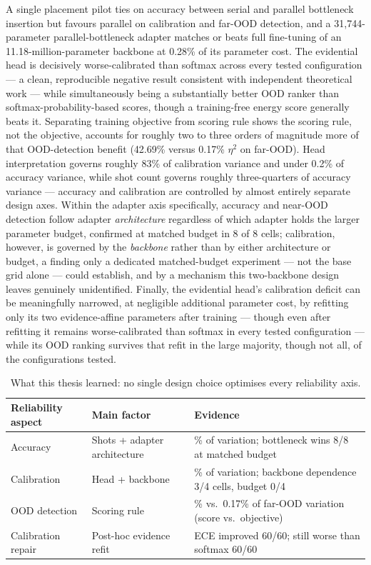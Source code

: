\documentclass{iutbscthesis}
\begin{document}
A single placement pilot ties on accuracy between serial and parallel bottleneck insertion but favours parallel on calibration and far-OOD detection, and a 31{,}744-parameter parallel-bottleneck adapter matches or beats full fine-tuning of an 11.18-million-parameter backbone at 0.28\% of its parameter cost. The evidential head is decisively worse-calibrated than softmax across every tested configuration — a clean, reproducible negative result consistent with independent theoretical work — while simultaneously being a substantially better OOD ranker than softmax-probability-based scores, though a training-free energy score generally beats it. Separating training objective from scoring rule shows the scoring rule, not the objective, accounts for roughly two to three orders of magnitude more of that OOD-detection benefit (42.69\% versus 0.17\% $\eta^2$ on far-OOD). Head interpretation governs roughly 83\% of calibration variance and under 0.2\% of accuracy variance, while shot count governs roughly three-quarters of accuracy variance — accuracy and calibration are controlled by almost entirely separate design axes. Within the adapter axis specifically, accuracy and near-OOD detection follow adapter \emph{architecture} regardless of which adapter holds the larger parameter budget, confirmed at matched budget in 8 of 8 cells; calibration, however, is governed by the \emph{backbone} rather than by either architecture or budget, a finding only a dedicated matched-budget experiment — not the base grid alone — could establish, and by a mechanism this two-backbone design leaves genuinely unidentified. Finally, the evidential head's calibration deficit can be meaningfully narrowed, at negligible additional parameter cost, by refitting only its two evidence-affine parameters after training — though even after refitting it remains worse-calibrated than softmax in every tested configuration — while its OOD ranking survives that refit in the large majority, though not all, of the configurations tested.

\begin{table}[H]
    \centering
    \small
    \begin{tabular}{l >{\raggedright\arraybackslash}p{3.4cm} >{\raggedright\arraybackslash}p{6.3cm}}
        \toprule
        Reliability aspect & Main factor & Evidence \\
        \midrule
        Accuracy & Shots + adapter architecture & 76\% of variation; bottleneck wins 8/8 at matched budget \\
        Calibration & Head + backbone & 83\% of variation; backbone dependence 3/4 cells, budget 0/4 \\
        OOD detection & Scoring rule & 42.7\% vs.\ 0.17\% of far-OOD variation (score vs.\ objective) \\
        Calibration repair & Post-hoc evidence refit & ECE improved 60/60; still worse than softmax 60/60 \\
        \bottomrule
    \end{tabular}
    \caption{What this thesis learned: no single design choice optimises every reliability axis.}
    \label{tab:conclusion-summary}
\end{table}
\end{document}
